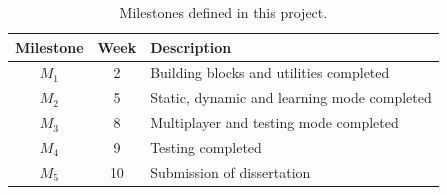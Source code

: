 \documentclass[a4paper,11pt]{article}
\begin{document}
\begin{table}[htbp]
    \begin{center}
        \begin{tabular}{|c|c|l|}
        \hline
        \textbf{Milestone} & \textbf{Week} & \textbf{Description} \\
        \hline
        $M_1$ & 2 & Building blocks and utilities completed \\
        $M_2$ & 5 & Static, dynamic and learning mode completed \\
        $M_3$ & 8 & Multiplayer and testing mode completed \\
        $M_4$ & 9 & Testing completed \\
        $M_5$ & 10 & Submission of dissertation \\
        \hline
        \end{tabular} 
    \end{center}
    \caption{Milestones defined in this project.}
    \label{fig:milestones}
\end{table}



\FloatBarrier

{\small
}
\end{document}
